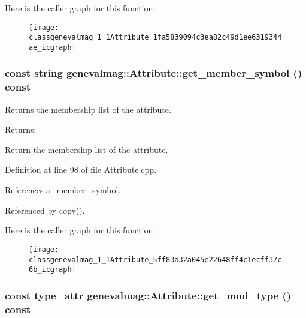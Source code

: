 Here is the caller graph for this function:\nopagebreak
\begin{figure}[H]
\begin{center}
\leavevmode
\texttt{[image: classgenevalmag\_1\_1Attribute\_1fa5839094c3ea82c49d1ee6319344ae\_icgraph]}
\end{center}
\end{figure}
\hypertarget{classgenevalmag_1_1Attribute_5ff83a32a045e22648ff4c1ecff37c6b}{
\subsubsection[{get\_\-member\_\-symbol}]{\setlength{\rightskip}{0pt plus 5cm}const string genevalmag::Attribute::get\_\-member\_\-symbol () const}}
\label{classgenevalmag_1_1Attribute_5ff83a32a045e22648ff4c1ecff37c6b}


Returns the membership list of the attribute. \begin{Desc}
\item[Returns:]\end{Desc}
Return the membership list of the attribute. 

Definition at line 98 of file Attribute.cpp.

References a\_\-member\_\-symbol.

Referenced by copy().

Here is the caller graph for this function:\nopagebreak
\begin{figure}[H]
\begin{center}
\leavevmode
\texttt{[image: classgenevalmag\_1\_1Attribute\_5ff83a32a045e22648ff4c1ecff37c6b\_icgraph]}
\end{center}
\end{figure}
\hypertarget{classgenevalmag_1_1Attribute_365a6121af9f7c698cecfc930568afc1}{
\subsubsection[{get\_\-mod\_\-type}]{\setlength{\rightskip}{0pt plus 5cm}const {\bf type\_\-attr} genevalmag::Attribute::get\_\-mod\_\-type () const}}
\label{classgenevalmag_1_1Attribute_365a6121af9f7c698cecfc930568afc1}


